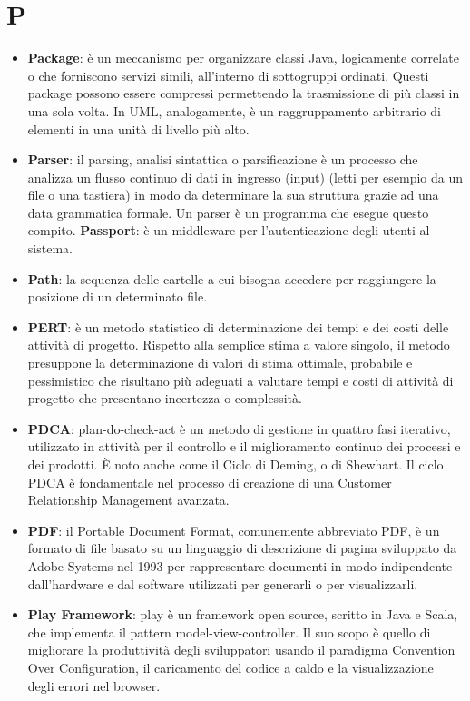 \section{P}
\begin{itemize} 
	\item
	\textbf{Package}: è un meccanismo per organizzare classi Java, logicamente correlate o che forniscono servizi simili, all’interno di sottogruppi ordinati. Questi package possono essere compressi permettendo la trasmissione di più classi in una sola volta. In UML, analogamente, è un raggruppamento arbitrario di elementi in una unità di livello più alto.
	\item
	\textbf{Parser}: il parsing, analisi sintattica o parsificazione è un processo che analizza un flusso continuo di dati in ingresso (input) (letti per esempio da un file o una tastiera) in modo da determinare la sua struttura grazie ad una data grammatica formale. Un parser è un programma che esegue questo compito.
	\textbf{Passport}: è un middleware per l'autenticazione degli utenti al sistema.
	\item
	\textbf{Path}: la sequenza delle cartelle a cui bisogna accedere per raggiungere la posizione di un determinato file.
	\item
	\textbf{PERT}: è un metodo statistico di determinazione dei tempi e dei costi delle attività di progetto. Rispetto alla semplice stima a valore singolo, il metodo presuppone la determinazione di valori di stima ottimale, probabile e pessimistico che risultano più adeguati a valutare tempi e costi di attività di progetto che presentano incertezza o complessità.
	\item
	\textbf{PDCA}: plan-do-check-act è un metodo di gestione in quattro fasi iterativo, utilizzato in attività per il controllo e il miglioramento continuo dei processi e dei prodotti. È noto anche come il Ciclo di Deming, o di Shewhart. Il ciclo PDCA è fondamentale nel processo di creazione di una Customer Relationship Management avanzata. 
	\item
	\textbf{PDF}: il Portable Document Format, comunemente abbreviato PDF, è un formato di file basato su un linguaggio di descrizione di pagina sviluppato da Adobe Systems nel 1993 per rappresentare documenti in modo indipendente dall’hardware e dal software utilizzati per generarli o per visualizzarli.
	\item
	\textbf{Play Framework}: play è un framework open source, scritto in Java e Scala, che implementa il pattern model-view-controller. Il suo scopo è quello di migliorare la produttività degli sviluppatori usando il paradigma Convention Over Configuration, il caricamento del codice a caldo e la visualizzazione degli errori nel browser.

\end{itemize}
